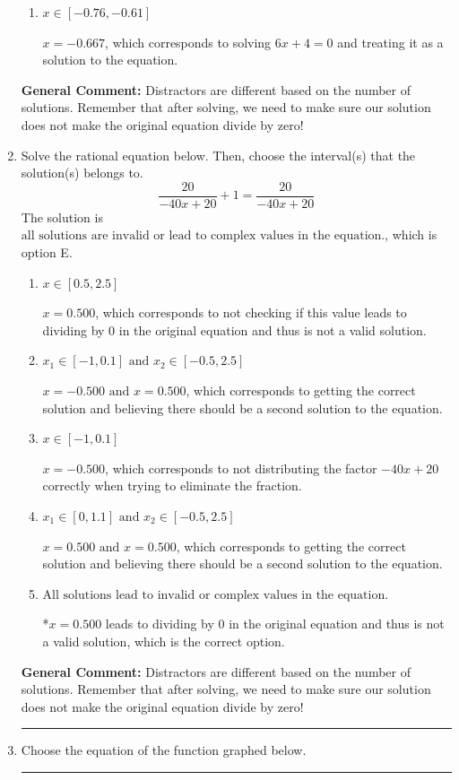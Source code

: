 \documentclass{extbook}[14pt]
\newcommand{\litem}[1]{\item #1

\rule{\textwidth}{0.4pt}}
\begin{document}
\begin{enumerate}
{\begin{enumerate}[label=\Alph*.]
$x = -1.000$, which corresponds to solving $6x + 6 = 0$ and treating it as a solution to the equation.
\item \( x \in [-0.76,-0.61] \)

$x = -0.667$, which corresponds to solving $6x + 4 = 0$ and treating it as a solution to the equation.
\end{enumerate}

\textbf{General Comment:} Distractors are different based on the number of solutions. Remember that after solving, we need to make sure our solution does not make the original equation divide by zero!
}
\litem{
Solve the rational equation below. Then, choose the interval(s) that the solution(s) belongs to.
\[ \frac{20}{-40x + 20} + 1 = \frac{20}{-40x + 20} \]The solution is \( \text{all solutions are invalid or lead to complex values in the equation.} \), which is option E.\begin{enumerate}[label=\Alph*.]
\item \( x \in [0.5,2.5] \)

$x = 0.500$, which corresponds to not checking if this value leads to dividing by 0 in the original equation and thus is not a valid solution.
\item \( x_1 \in [-1, 0.1] \text{ and } x_2 \in [-0.5,2.5] \)

$x = -0.500 \text{ and } x = 0.500$, which corresponds to getting the correct solution and believing there should be a second solution to the equation.
\item \( x \in [-1,0.1] \)

$x = -0.500$, which corresponds to not distributing the factor $-40x + 20$ correctly when trying to eliminate the fraction.
\item \( x_1 \in [0, 1.1] \text{ and } x_2 \in [-0.5,2.5] \)

$x = 0.500 \text{ and } x = 0.500$, which corresponds to getting the correct solution and believing there should be a second solution to the equation.
\item \( \text{All solutions lead to invalid or complex values in the equation.} \)

*$x = 0.500$ leads to dividing by 0 in the original equation and thus is not a valid solution, which is the correct option.
\end{enumerate}

\textbf{General Comment:} Distractors are different based on the number of solutions. Remember that after solving, we need to make sure our solution does not make the original equation divide by zero!
}
\litem{
Choose the equation of the function graphed below.

}
\end{enumerate}
\end{document}
